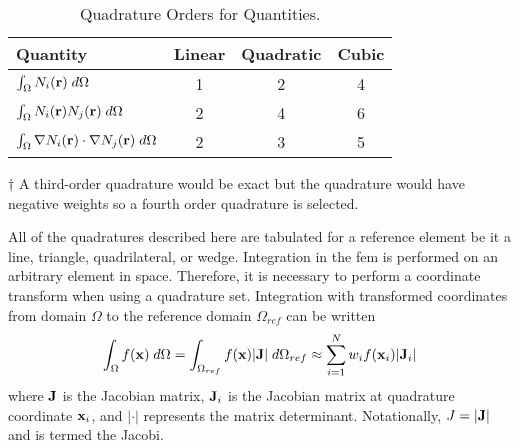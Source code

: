     \begin{table}
      \begin{center}
        \caption{Quadrature Orders for  Quantities.}
        \label{tab:quadrature_orders}
        \begin{threeparttable}
          \begin{tabular}{lccc}
            \toprule
            Quantity & Linear & Quadratic & Cubic \\
            \midrule
            $\int_{\Omega} N_i(\mathbf{r}) \;d\Omega$ & 1 & 2 & 4
              \tnote{$\dagger$} \\
            $\int_{\Omega} N_i(\mathbf{r}) N_j(\mathbf{r}) \;d\Omega$ &
              2 & 4 & 6 \\
            $\int_{\Omega} \mathbf{\nabla} N_i(\mathbf{r}) \cdot \mathbf{\nabla} N_j(\mathbf{r}) 
              \;d\Omega$ & 2 & 3 & 5 \\
            \bottomrule
          \end{tabular}
          \begin{tablenotes}
            \item[$\dagger$] A third-order quadrature would be exact but the 
              quadrature would have negative weights so a fourth order 
              quadrature is selected.
          \end{tablenotes}
        \end{threeparttable}
      \end{center}
    \end{table}
    
    All of the quadratures described here are tabulated for a reference element
    be it a line, triangle, quadrilateral, or wedge. Integration in the 
    \gls{fem} is performed on an arbitrary element in space. Therefore, it is 
    necessary to perform a coordinate transform when using a quadrature set.
    Integration with transformed coordinates from domain $\Omega$ to the
    reference domain $\Omega_{ref}$ can be written
    \begin{equation}
      \int_{\Omega} f(\mathbf{x}) \;d\Omega = 
        \int_{\Omega_{ref}} f(\mathbf{x}) \lvert \mathbf{J} \rvert \;d\Omega_{ref} \approx
        \sum_{i=1}^{N} w_i f(\mathbf{x}_i) \lvert \mathbf{J}_i \rvert
    \end{equation}
    where $\mathbf{J}$ is the Jacobian matrix, $\mathbf{J}_i$ is the Jacobian matrix at 
    quadrature coordinate $\mathbf{x}_i$, and $\lvert \cdot \rvert$ represents
    the matrix determinant. Notationally, $J=\lvert \mathbf{J} \rvert$ and is termed
    the Jacobi.

